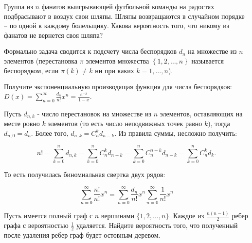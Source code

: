 \begin{problem}
Группа из $n$ фанатов выигрывающей футбольной команды на радостях 
подбрасывают в воздух свои шляпы. Шляпы возвращаются в случайном порядке -- 
по одной к каждому болельщику. Какова вероятность того, что никому из 
фанатов не вернется своя шляпа?
\end{problem}

\begin{ordre}
Формально задача сводится к подсчету числа беспорядков $d_{n} $ на множестве из $n$ элементов (перестановка $\pi $ элементов множества $\left\{1,2,\ldots ,n\right\}$ называется беспорядком, если $\pi (k)\ne k$ ни при каких $k=1,\ldots ,n$).

Получите экспоненциальную производящая функция для числа беспорядков: $D(x)=\sum _{n=0}^{\infty }\frac{d_{n} }{n!} x^{n}  =\frac{e^{-x} }{1-x} $.

Пусть $d_{n,k} $ - число перестановок на множестве из $n$ элементов, оставляющих на месте ровно $k$ элементов (то есть число неподвижных точек равно $k$), тогда $d_{n,0} =d_{n} $. Более того, $d_{n,k} =C_{n}^{k} d_{n-k} $. Из правила суммы, несложно получить:

\[n!=\sum _{k=0}^{n}d_{n,k}  =\sum _{k=0}^{n}C_{n}^{k} d_{n-k}  =\sum _{k=0}^{n}C_{n}^{n-k} d_{n-k}  =\sum _{k=0}^{n}C_{n}^{k} d_{k}  .\] 

То есть получилась биномиальная свертка двух рядов:

\[\sum _{n=0}^{\infty }\frac{n!}{n!} x^{n}  =\sum _{n=0}^{\infty }\frac{d_{n} }{n!} x^{n}  \sum _{n=0}^{\infty }\frac{1}{n!} x^{n}  \] 

\end{ordre}

\begin{problem}

Пусть имеется полный граф с $n$ вершинами $\{ 1,2,\ldots ,n\} $. Каждое из $\frac{n(n-1)}{2} $ ребер графа с вероятностью $\frac{1}{2} $ удаляется. Найдите вероятность того, что полученный после удаления ребер граф будет остовным деревом.

\end{problem}


